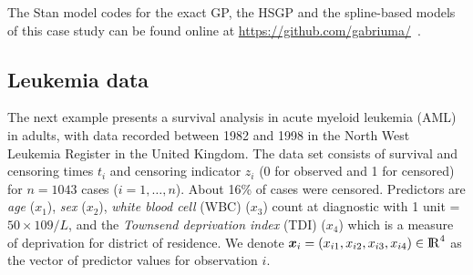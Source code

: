 %

The Stan model codes for the exact GP, the HSGP and the spline-based models of this case study can be found online at {\small \url{https://github.com/gabriuma/}} \,.


\subsection{Leukemia data}\label{sec_bf_caseVI}

The next example presents a survival analysis in acute myeloid leukemia (AML) in adults, with data recorded between 1982 and 1998 in the North West Leukemia Register in the United Kingdom. The data set consists of survival and censoring times $t_i$ and censoring indicator $z_i$ (0 for observed and 1 for censored) for $n=1043$ cases ($i=1,\dots,n$). About 16\% of cases were censored. Predictors are \textit{age} ($x_1$), \textit{sex} ($x_2$), \textit{white blood cell} (WBC) ($x_3$) count at diagnostic with 1 unit = $50\times109/L$, and the \textit{Townsend deprivation index} (TDI) ($x_4$) which is a measure of deprivation for district of residence. We denote $\bm{x}_i=(x_{i1},x_{i2},x_{i3},x_{i4}) \in {\rm I\!R}^{4}$ as the vector of predictor values for observation $i$.

